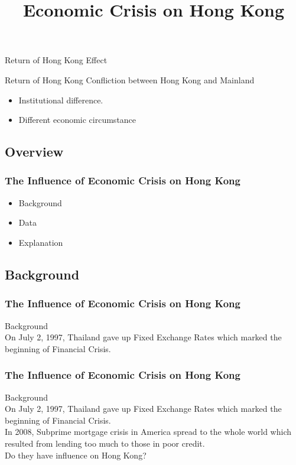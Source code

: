 \documentclass[slidestop,uncompress,mathsans, 12pt]{beamer}
\begin{document}
\begin{frame}{Return of Hong Kong}
Effect
\begin{block}{}
\end{block}
\end{frame}
\begin{frame}{Return of Hong Kong}
Confliction between Hong Kong and Mainland\\
\begin{itemize}
\bigskip
\item Institutional difference.
\bigskip
\bigskip
\item Different economic circumstance 
\end{itemize}


\end{frame}
\subsection{Overview}
\begin{frame}
\title{Economic Crisis on Hong Kong }
\date{}
\titlepage
\end{frame}
\begin{frame}
\frametitle{The Influence of Economic Crisis on Hong Kong 
}
\begin{itemize}
\item Background
\bigskip
\item Data
\bigskip
\item Explanation
\end{itemize}
\end{frame}

\subsection{Background}
\begin{frame}

\frametitle{The Influence of Economic Crisis on Hong Kong }
Background\\
\bigskip
\transglitter[direction=315]
On July 2, 1997, Thailand gave up Fixed Exchange Rates which marked the beginning of Financial Crisis.\\
\end{frame}
\begin{frame}
\frametitle{The Influence of Economic Crisis on Hong Kong }
Background\\
\bigskip
On July 2, 1997, Thailand gave up Fixed Exchange Rates which marked the beginning of Financial Crisis.\\
\bigskip
{}
In 2008, Subprime mortgage crisis in America spread to the whole world which resulted from lending too much to those in poor credit.
\\
\bigskip
Do they have influence on Hong Kong? 
\end{frame}
\end{document}
